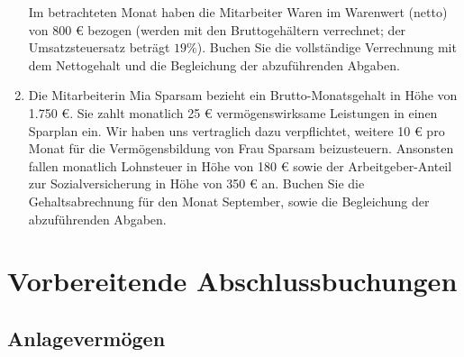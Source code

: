 \documentclass[paper=a4, fontsize=11pt]{scrartcl}
\numberwithin{equation}{section}
\numberwithin{figure}{section}
\numberwithin{table}{section}
\begin{document}
\begin{enumerate}
\begin{itemize}
\end{itemize} 
Im betrachteten Monat haben die Mitarbeiter Waren im Warenwert (netto) von 800 € bezogen (werden mit den Bruttogehältern verrechnet; der Umsatzsteuersatz beträgt $19 \%$). Buchen Sie die vollständige Verrechnung mit dem Nettogehalt und die Begleichung der abzuführenden Abgaben. 
\item Die Mitarbeiterin Mia Sparsam bezieht ein Brutto-Monatsgehalt in Höhe von 1.750 €. Sie zahlt monatlich 25 € vermögenswirksame Leistungen in einen Sparplan ein. Wir haben uns vertraglich dazu verpflichtet, weitere 10 € pro Monat für die Vermögensbildung von Frau Sparsam beizusteuern. Ansonsten fallen monatlich Lohnsteuer in Höhe von 180 € sowie der Arbeitgeber-Anteil zur Sozialversicherung in Höhe von 350 € an. Buchen Sie die Gehaltsabrechnung für den Monat September, sowie die Begleichung der abzuführenden Abgaben.
\end{enumerate}
\section{Vorbereitende Abschlussbuchungen}
\subsection{Anlagevermögen}
\end{document}
